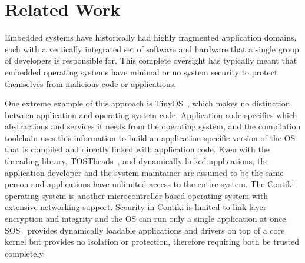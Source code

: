\section{Related Work}

Embedded systems have historically had highly fragmented application domains,
each with a vertically integrated set of software and hardware
that a single group of developers
is responsible for.
This complete oversight has typically meant
that embedded operating systems have
minimal or no system security to protect themselves from malicious code
or applications.

One extreme example of this approach is TinyOS~\cite{tinyos}, which makes no
distinction between application and operating system code. Application
code specifies which abstractions and services it needs from the
operating system, and the compilation toolchain uses this information
to build an application-specific version of the OS that is compiled
and directly linked with application code.
Even with the threading library, TOSTheads~\cite{tosthreads}, and
dynamically linked applications, the
application
developer and the system maintainer are assumed to be the same person
and applications
have unlimited access to the entire system.
The Contiki~\cite{contiki} operating system is another microcontroller-based
operating system
with extensive networking support. Security in Contiki is limited to
link-layer encryption and integrity and the OS can run only a single
application at once. SOS~\cite{han05sos}
provides dynamically loadable applications  and drivers on top of a
core kernel but provides no isolation or protection, therefore requiring 
both be trusted completely.


